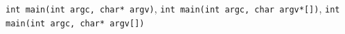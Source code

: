 %
{{\texttt{int main(int argc, char* argv)}},
 {\texttt{int main(int argc, char argv*[])}},
 {\texttt{int main(int argc, char* argv[])}}}
\endinput